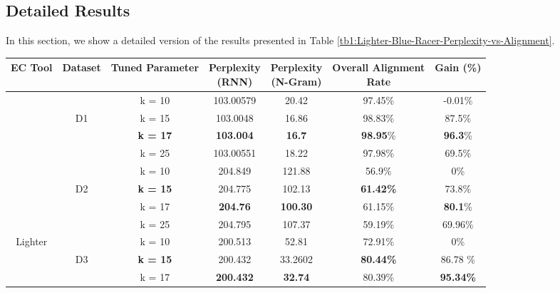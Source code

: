 \subsection{Detailed Results}

In this section, we show a detailed version of the results presented in Table \ref{tb1:Lighter-Blue-Racer-Perplexity-vs-Alignment}. 
\begin{table}
\centering
\small
\begin{tabular}{ |c|c|c|c|c|c|c| } 
\hline
EC Tool & {Dataset} & Tuned Parameter & \makecell{Perplexity\\(RNN)} & \makecell{Perplexity\\(N-Gram)} & \makecell{Overall Alignment\\ Rate} & Gain (\%) \\  
 \hline
 					  &  & k = 10 & 103.00579 & 20.42 & 97.45\% & -0.01\% \\ 
 					  & D1 & k = 15 & 103.0048 & 16.86 & 98.83\% & 87.5\% \\ 
 					  &  & \textbf{k = 17} & \textbf{103.004} &  \textbf{16.7}  & \textbf{98.95}\% & \textbf{96.3}\% \\ 
 					  &  & k = 25 &  103.00551 &  18.22 & 97.98\% & 69.5\%  
\\\cline{2-7}
     					  &  & k = 10 & 204.849 & 121.88 & 56.9\% & 0\%  \\ 
						  & D2 & \textbf{k = 15} & 204.775 & 102.13 & \textbf{61.42\%} & 73.8\% \\ 
     					  &  & k = 17 &  \textbf{204.76} &  \textbf{100.30}  & 61.15\% & \textbf{80.1}\% \\
     					  &  & k = 25 & 204.795 & 107.37 & 59.19\%  & 69.96\%
 \\\cline{2-7}
     		\multirow{4}{*}{Lighter} &  & k = 10 & 200.513 & 52.81 & 72.91\% & 0\% \\ 
     					  & D3 & \textbf{k = 15} & 200.432 & 33.2602 & \textbf{80.44\%} & 86.78 \% \\ 
     					  &  & k = 17 & \textbf{200.432} & \textbf{32.74}  & 80.39\% & \textbf{95.34\%}\\ 

\end{tabular}
\end{table}

